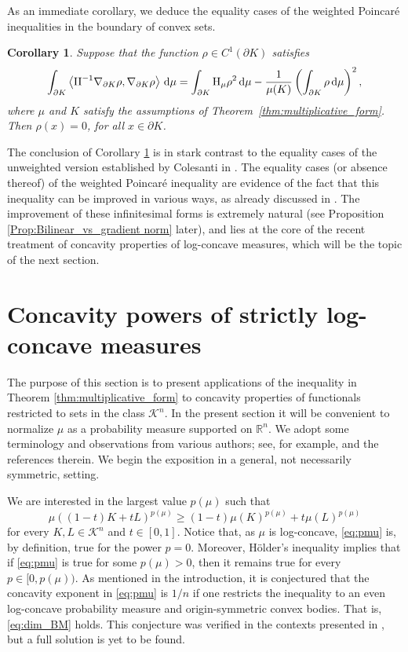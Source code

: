 \documentclass[a4paper, 11pt]{article}
\newcommand{\K}{\mathcal{K}}
\newtheorem{corollary}[theorem]{Corollary}
\theoremstyle{definition}
\newcommand{\di}{\, \mathrm{d}}
\begin{document}
As an immediate corollary, we deduce the equality cases of the weighted Poincar\'{e} inequalities in the boundary of convex sets.
\begin{corollary}\label{cor:eq_case}
Suppose that the function $\rho \in C^{1}(\partial K)$ satisfies
\[\int_{\partial K} \left\langle {\rm{II}}^{-1}\nabla_{\partial K}\rho, \nabla_{\partial K} \rho \right\rangle \di \mu =\int_{\partial K}{\rm H}_\mu\rho^2\di \mu  -\frac{1}{\mu(K)}\left( \int_{\partial K}\rho \di \mu  \right)^2 , \]
where $\mu$ and $K$ satisfy the assumptions of Theorem~\ref{thm:multiplicative_form}. Then $\rho(x)=0$, for all $x \in \partial K$.
\end{corollary}\noindent
The conclusion of Corollary \ref{cor:eq_case} is in stark contrast to the equality cases of the unweighted version established by Colesanti in \cite{Colesanti_poincare}. The equality cases (or absence thereof) of the weighted Poincar\'{e} inequality are evidence of the fact that this inequality can be improved in various ways, as already discussed in \cite{Kol_Mil_P}. The improvement of these infinitesimal forms is extremely natural (see Proposition \ref{Prop:Bilinear_vs_gradient norm} later), and lies at the core of the recent treatment of concavity properties of log-concave measures, which will be the topic of the next section. 

\section{Concavity powers of strictly log-concave measures}

The purpose of this section is to present applications of the inequality in Theorem \ref{thm:multiplicative_form} to concavity properties of functionals restricted to sets in the class $\mathcal{K}^n$. In the present section it will be convenient to normalize $\mu$ as a probability measure supported on $\mathbb{R}^n$. We adopt some terminology and observations from various authors; see, for example, \cite[Section 3]{GalynaStability} and the references therein. We begin the exposition in a general, not necessarily symmetric, setting.

\medskip

We are interested in the largest value $p(\mu)$ such that 
\begin{equation}\label{eq:pmu}
    \mu((1-t)K+tL)^{p(\mu)} \geq (1-t)\mu(K)^{p(\mu)}+t\mu(L)^{p(\mu)}
\end{equation}
for every $K,L \in \K^n$ and $t \in [0,1]$. Notice that, as $\mu$ is log-concave, \eqref{eq:pmu} is, by definition, true for the power $p=0$. Moreover, H\"older's inequality implies that if \eqref{eq:pmu} is true for some $p(\mu)>0$, then it remains true for every $p \in [0,p(\mu))$. As mentioned in the introduction, it is conjectured that the concavity exponent in \eqref{eq:pmu} is $1/n$ if one restricts the inequality to an even log-concave probability measure and origin-symmetric convex bodies. That is, \eqref{eq:dim_BM} holds. This conjecture was verified in the contexts presented in \cite{dim_gauss, rot_B, cordero2025concavity}, but a full solution is yet to be found.  
\end{document}
